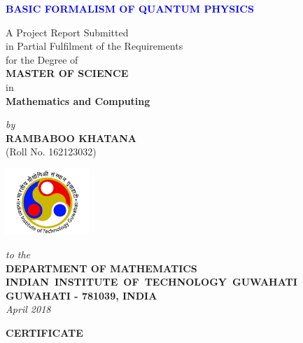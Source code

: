 \documentclass[12pt,a4wide]{report}
\theoremstyle{plain}
\theoremstyle{definition}
\theoremstyle{remark}
\begin{document}

\begin{titlepage}
\enlargethispage{3cm}

\begin{center}

\vspace*{-2cm}

\textbf{\textcolor{blue}{\Large BASIC FORMALISM OF QUANTUM PHYSICS}}

\vfill

 A Project Report Submitted \\
 in Partial Fulfilment of the Requirements  \\
  for the Degree of  \\[10pt]

 {\Large \bf MASTER OF SCIENCE}\\[5pt]
 in \\
 {\large \bf Mathematics and Computing}

 \vfill

{\large \emph{by}}\\[5pt]
{\large\bf {RAMBABOO KHATANA}}\\[5pt]
{\large (Roll No. 162123032)}

\vfill
\includegraphics[height=2.5cm]{iitg.jpg}

\vspace*{0.5cm}

{\em\large to the}\\[10pt]
{\bf\large DEPARTMENT OF MATHEMATICS} \\[5pt]
{\bf\large \mbox{INDIAN INSTITUTE OF TECHNOLOGY GUWAHATI}}\\[5pt]
{\bf\large GUWAHATI - 781039, INDIA}\\[10pt]
{\it\large April 2018}
\end{center}

\end{titlepage}

\clearpage

 \setcounter{page}{2}
\begin{center}
{\Large{\bf{CERTIFICATE}}}
\end{center}
\end{document}
